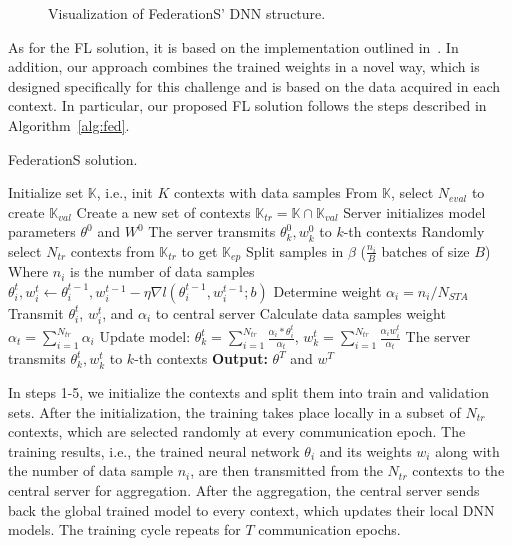 \documentclass[10pt,a4paper,twocolumn]{article}
\newcommand{\ITUpar}{\vspace{8pt}\par}
\def\startfigure{\vspace{6pt}\begin{figure}[ht]\center}
\begin{document}
\startfigure
\centering

\caption{Visualization of FederationS' DNN structure.}
\label{fig:DNN model}
\end{figure}

As for the FL solution, it is based on the implementation outlined in~\cite{federated_repo}. In addition, our approach combines the trained weights in a novel way, which is designed specifically for this challenge and is based on the data acquired in each context. In particular, our proposed FL solution follows the steps described in Algorithm~\ref{alg:fed}.\ITUpar

\begin{algorithm}[ht!]
	\caption{FederationS solution.}
	\begin{algorithmic}[1]
		\State Initialize set $\mathbb{K}$, i.e., init $K$ contexts with data samples
		\State From $\mathbb{K}$, select $N_{eval}$ to create $\mathbb{K}_{val}$
		\State Create a new set of contexts $\mathbb{K}_{tr} =  \mathbb{K} \cap \mathbb{K}_{val}$
		\State Server initializes model parameters $\theta^0$ and $W^0$
		\State The server transmits $\theta_k^0, w_k^0$ to $k$-th contexts
		\State Randomly select $N_{tr}$ contexts from $\mathbb{K}_{tr}$ to get $\mathbb{K}_{ep}$
		\State Split samples in $\beta$ ($\frac{n_i}{B}$ batches of size $B$)
		\State Where $n_i$ is the number of data samples 
		\State  $\theta_i^t, w_i^t \leftarrow \theta_i^{t-1}, w_i^{t-1} - \eta \nabla l(\theta_i^{t-1}, w_i^{t-1};b)$
		\EndFor
		\State Determine weight $\alpha_i = n_i/N_{STA}$
		\State Transmit $\theta_i^t$, $w_i^t$, and $\alpha_i$ to central server
		\EndFor
		\State Calculate data samples weight $\alpha_{t} = \sum^{N_{tr}}_{i=1} \alpha_i$
		\State Update model: $\theta_k^t = \sum^{N_{tr}}_{i=1}  \frac{\alpha_i *\theta_i^t }{\alpha_t}$, $w_k^t = \sum^{N_{tr}}_{i=1}  \frac{\alpha_i w_i^t }{\alpha_t}$
		\State The server transmits $\theta_k^t, w_k^t$ to $k$-th contexts
		\EndFor
		\State \textbf{Output:} $\theta^T$ and $w^T$
	\end{algorithmic} \label{alg:fed}
\end{algorithm}

In steps 1-5, we initialize the contexts and split them into train and validation sets. After the initialization, the training takes place locally in a subset of $N_{tr}$ contexts, which are selected randomly at every communication epoch. The training results, i.e., the trained neural network $\theta_i$ and its weights $w_i$ along with the number of data sample $n_i$, are then transmitted from the $N_{tr}$ contexts to the central server for aggregation. After the aggregation, the central server sends back the global trained model to every context, which updates their local DNN models. The training cycle repeats for $T$ communication epochs. \ITUpar
\end{document}

